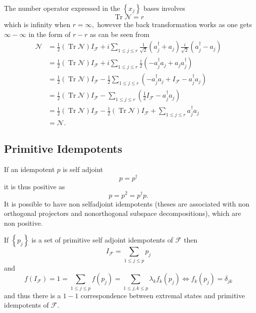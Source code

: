 \documentclass[aps,preprint]{revtex4}%
\begin{document}
The number operator expressed in the $\left\{  x_{j}\right\}  $ bases
involves
\begin{equation}
\operatorname*{Tr}\mathcal{N}=r
\end{equation}
which is infinity when $r=\infty,$ however the back transformation works as
one gets $\infty-\infty$ in the form of $r-r$ as can be seen from%
\begin{align}
\mathcal{N}  & =\frac{1}{2}\left(  \operatorname*{Tr}\mathcal{N}\right)
I_{\mathcal{F}}+i\sum_{1\leq j\leq r}\frac{1}{\sqrt{2}}\left(  a_{j}^{\dagger
}+a_{j}\right)  \frac{i}{\sqrt{2}}\left(  a_{j}^{\dagger}-a_{j}\right)
\nonumber\\
& =\frac{1}{2}\left(  \operatorname*{Tr}\mathcal{N}\right)  I_{\mathcal{F}%
}+i\sum_{1\leq j\leq r}\frac{i}{2}\left(  -a_{j}^{\dagger}a_{j}+a_{j}%
a_{j}^{\dagger}\right)  \nonumber\\
& =\frac{1}{2}\left(  \operatorname*{Tr}\mathcal{N}\right)  I_{\mathcal{F}%
}-\frac{1}{2}\sum_{1\leq j\leq r}\left(  -a_{j}^{\dagger}a_{j}+I_{\mathcal{F}%
}-a_{j}^{\dagger}a_{j}\right)  \nonumber\\
& =\frac{1}{2}\left(  \operatorname*{Tr}\mathcal{N}\right)  I_{\mathcal{F}%
}-\sum_{1\leq j\leq r}\left(  \frac{1}{2}I_{\mathcal{F}}-a_{j}^{\dagger}%
a_{j}\right)  \nonumber\\
& =\frac{1}{2}\left(  \operatorname*{Tr}\mathcal{N}\right)  I_{\mathcal{F}%
}-\frac{1}{2}\left(  \operatorname*{Tr}\mathcal{N}\right)  I_{\mathcal{F}%
}+\sum_{1\leq j\leq r}a_{j}^{\dagger}a_{j}\nonumber\\
& =\mathcal{N}.
\end{align}


\subsection{Primitive Idempotents}

If an idempotent $p$ is self adjoint
\begin{equation}
p=p^{\dagger}%
\end{equation}
it is thus positive as
\begin{equation}
p=p^{2}=p^{\dagger}p.
\end{equation}
It is possible to have non selfadjoint idempotents (theses are associated with
non orthogonal projectors and nonorthogonal subspace decompositions), which
are non positive.

If $\left\{  p_{j}\right\}  $ is a set of primitive self adjoint idempotents
of $\mathcal{F}$ then
\begin{equation}
I_{\mathcal{F}}=\sum_{1\leq j\leq p}p_{j}%
\end{equation}
and
\begin{equation}
f\left(  I_{\mathcal{F}}\right)  =1=\sum_{1\leq j\leq p}f\left(  p_{j}\right)
=\sum_{1\leq j,k\leq p}\lambda_{k}f_{k}\left(  p_{j}\right)  \Leftrightarrow
f_{k}\left(  p_{j}\right)  =\delta_{jk}%
\end{equation}
and thus there is a $1-1$ correspondence between extremal states and primitive
idempotents of $\mathcal{F}.$
\end{document}
